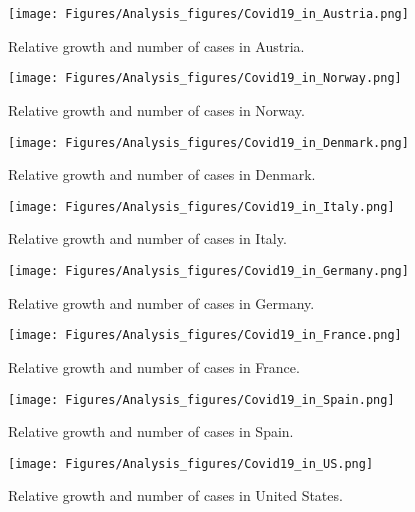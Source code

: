 \begin{figure}
    \centering
    \texttt{[image: Figures/Analysis\_figures/Covid19\_in\_Austria.png]}
    \caption{Relative growth and number of cases in Austria.}\label{fig:Austria}
\end{figure}

\begin{figure}
    \centering
    \texttt{[image: Figures/Analysis\_figures/Covid19\_in\_Norway.png]}
    \caption{Relative growth and number of cases in Norway.}\label{fig:Norway}
\end{figure}

\begin{figure}
    \centering
    \texttt{[image: Figures/Analysis\_figures/Covid19\_in\_Denmark.png]}
    \caption{Relative growth and number of cases in Denmark.}\label{fig:Denmark}
\end{figure}
\begin{figure}
    \centering
    \texttt{[image: Figures/Analysis\_figures/Covid19\_in\_Italy.png]}
    \caption{Relative growth and number of cases in Italy.}\label{fig:Italy}
\end{figure}

\begin{figure}
    \centering
    \texttt{[image: Figures/Analysis\_figures/Covid19\_in\_Germany.png]}
    \caption{Relative growth and number of cases in Germany.}\label{fig:Germany}
\end{figure}

\begin{figure}
    \centering
    \texttt{[image: Figures/Analysis\_figures/Covid19\_in\_France.png]}
    \caption{Relative growth and number of cases in France.}\label{fig:France}
\end{figure}

\begin{figure}
    \centering
    \texttt{[image: Figures/Analysis\_figures/Covid19\_in\_Spain.png]}
    \caption{Relative growth and number of cases in Spain.}\label{fig:Spain}
\end{figure}

\begin{figure}
    \centering
    \texttt{[image: Figures/Analysis\_figures/Covid19\_in\_US.png]}
    \caption{Relative growth and number of cases in United States.}\label{fig:US}
\end{figure}

